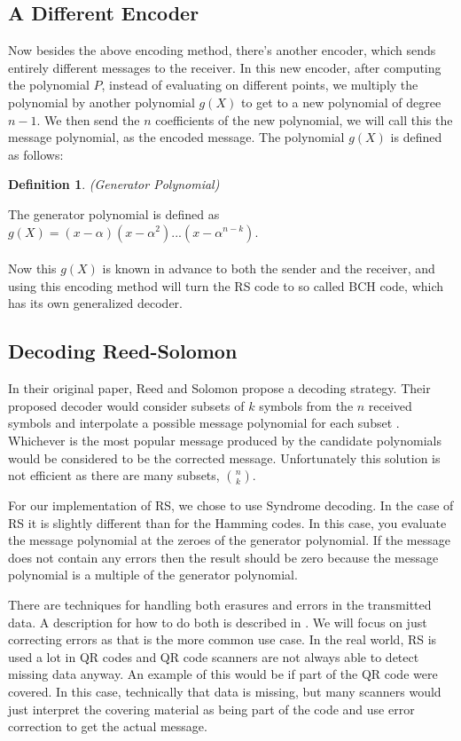 \documentclass{article}
\newtheorem{Definition}{Definition}
\begin{document}
\subsection{A Different Encoder}
Now besides the above encoding method, there's another encoder, which sends entirely different messages to the receiver. In this new encoder, after computing the polynomial $P$, instead of evaluating on different points, we multiply the polynomial by another polynomial $g(X)$ to get to a new polynomial of degree $n-1$. We then send the $n$ coefficients of the new polynomial, we will call this the message polynomial, as the encoded message. The polynomial $g(X)$ is defined as follows:
\begin{Definition}(Generator Polynomial)\end{Definition}
\noindent The generator polynomial is defined as $g(X) = (x-\alpha)(x-\alpha^2)...(x-\alpha^{n-k})$.\\\\
Now this $g(X)$ is known in advance to both the sender and the receiver, and using this encoding method will turn the RS code to so called BCH code, which has its own generalized decoder.

\subsection{Decoding Reed-Solomon}
\noindent In their original paper, Reed and Solomon propose a decoding strategy. Their proposed decoder would consider subsets of $k$ symbols from the $n$ received symbols and  interpolate a possible message polynomial for each subset \cite{reed-solomon}. Whichever is the most popular message produced by the candidate polynomials would be considered to be the corrected message. Unfortunately this solution is not efficient as there are many subsets, ${n \choose k}$.

For our implementation of RS, we chose to use Syndrome decoding. In the case of RS it is slightly different than for the Hamming codes. In this case, you evaluate the message polynomial at the zeroes of the generator polynomial. If the message does not contain any errors then the result should be zero because the message polynomial is a multiple of the generator polynomial. 

There are techniques for handling both erasures and errors in the transmitted data. A description for how to do both is described in \cite{wikiversity}. We will focus on just correcting errors as that is the more common use case. In the real world, RS is used a lot in QR codes and QR code scanners are not always able to detect missing data anyway. An example of this would be if part of the QR code were covered. In this case, technically that data is missing, but many scanners would just interpret the covering material as being part of the code and use error correction to get the actual message.
\end{document}
